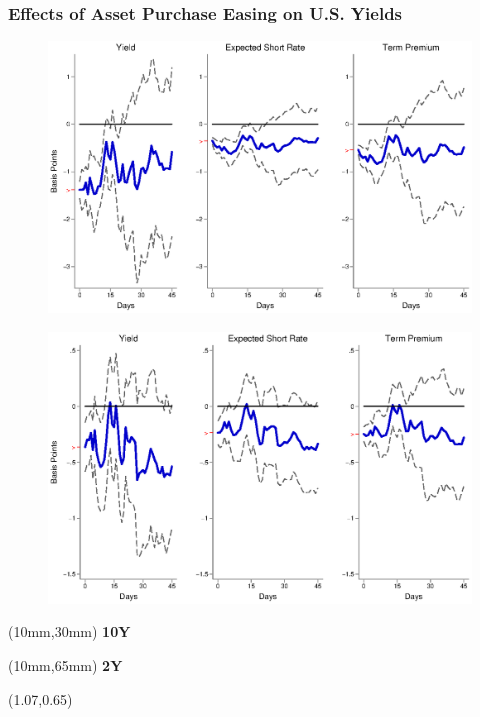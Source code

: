 \documentclass[12pt, aspectratio=169, xcolor=dvipsnames]{beamer}
\begin{document}
\begin{frame}[label=LSAPUS]
\frametitle{Effects of Asset Purchase Easing on U.S. Yields}
\begin{figure}[!htbp]
\begin{center} %
\includegraphics[trim={0cm 0cm 0cm 0cm},clip,height=0.45\textheight,width=0.85\linewidth]{../Figures/LPs/LagDep-FX/LSAP/US/DCMP/LSAPUSDnomyptp120m.eps}
\par\end{center}
\end{figure}
\vspace{-0.5cm}
\begin{figure}[!htbp]
\begin{center} %
\includegraphics[trim={0cm 0cm 0cm 0.76cm},clip,height=0.45\textheight,width=0.85\linewidth]{../Figures/LPs/LagDep-FX/LSAP/US/DCMP/LSAPUSDnomyptp24m.eps}
\par\end{center}
\end{figure}
\begin{textblock*}{8mm}(10mm,30mm)
\small \textbf{10Y}
\end{textblock*}
\begin{textblock*}{8mm}(10mm,65mm)
\small \textbf{2Y}
\end{textblock*}
\begin{textblock*}{5cm}(1.07\textwidth,0.65\textheight)
\hyperlink{LSAPEM}{}
\end{textblock*}
\end{frame}
\end{document}
